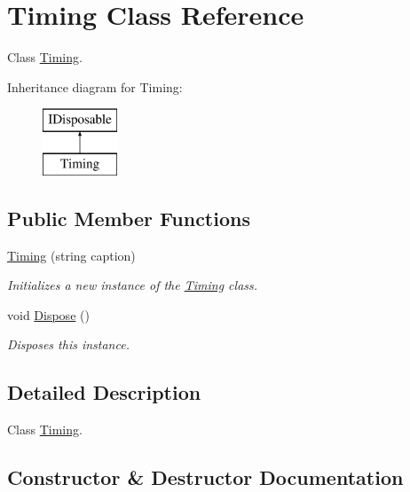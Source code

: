 \hypertarget{class_timing}{}\section{Timing Class Reference}
\label{class_timing}


Class \hyperlink{class_timing}{Timing}.  


Inheritance diagram for Timing\+:\begin{figure}[H]
\begin{center}
\leavevmode
\includegraphics[height=2.000000cm]{class_timing}
\end{center}
\end{figure}
\subsection*{Public Member Functions}
\begin{DoxyCompactItemize}
\item 
\hyperlink{class_timing_ab4f3d9f7f0d4b8e8813a7dda642a63a4}{Timing} (string caption)
\begin{DoxyCompactList}\small\item\em Initializes a new instance of the \hyperlink{class_timing}{Timing} class. \end{DoxyCompactList}\item 
void \hyperlink{class_timing_a955a1d9e65579124a6ba9da8a47bc2f8}{Dispose} ()
\begin{DoxyCompactList}\small\item\em Disposes this instance. \end{DoxyCompactList}\end{DoxyCompactItemize}


\subsection{Detailed Description}
Class \hyperlink{class_timing}{Timing}. 



\subsection{Constructor \& Destructor Documentation}
\mbox{\label{class_timing_ab4f3d9f7f0d4b8e8813a7dda642a63a4}} 
